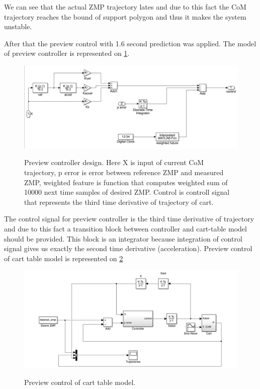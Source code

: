 \documentclass[12pt,a4paper]{report}
\begin{document}
		We can see that the actual ZMP trajectory lates and due to this fact the CoM trajectory reaches the bound of support polygon and thus it makes the system unstable.
		
		After that the preview control with 1.6 second prediction was applied. The model of preview controller  is represented on \cref{fig:18}.
		
		\begin{figure}[h!]
			\vspace{-0.2cm}
			\centering
			{\includegraphics[width=1\textwidth]{18}}
			\caption{Preview controller design. Here X is input of current CoM trajectory, p error is error between reference ZMP and measured ZMP, weighted feature is function that computes weighted sum of 10000 next time samples of desired ZMP. Control is controll signal that represents the third time derivative of trajectory of cart.}
			\label{fig:18}
			\vspace{-0.1cm}
		\end{figure}
		
		The control signal for preview controller is the third time derivative of trajectory and due to this fact a transition block between controller and cart-table model should be provided. This block is an integrator because integration of control signal gives us exactly the second time derivative (acceleration). Preview control of cart table model is represented on \cref{fig:20}
		
		\begin{figure}[h!]
			\vspace{-0.2cm}
			\centering
			{\includegraphics[width=1\textwidth]{20}}
			\caption{Preview control of cart table model.}
			\label{fig:20}
			\vspace{-0.1cm}
		\end{figure}
		
\end{document}
